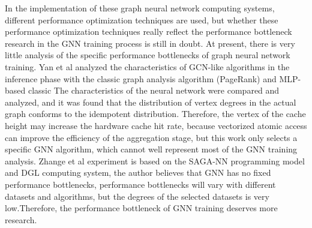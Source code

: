 In the implementation of these graph neural network computing systems, 
different performance optimization techniques are used, 
but whether these performance optimization techniques really reflect the performance bottleneck
research in the GNN training process is still in doubt. 
At present, there is very little analysis of the specific performance bottlenecks of graph 
neural network training. Yan et al\cite{yan2020_analysis_gcns_gpu} analyzed the characteristics of GCN-like algorithms
in the inference phase with the classic graph analysis algorithm (PageRank) and MLP-based classic
The characteristics of the neural network were compared and analyzed, 
and it was found that the distribution of vertex degrees in the actual graph conforms
 to the idempotent distribution. Therefore, the vertex of the cache height may increase the hardware
cache hit rate, because vectorized atomic access can improve the efficiency of the aggregation stage, 
but this work only selects a specific GNN algorithm, which cannot well represent most of the GNN training
analysis. Zhange et al\cite{zhang2020_analysis_neugraph} experiment is based on the SAGA-NN programming model and DGL computing system,
the author believes that GNN has no fixed performance bottlenecks, performance bottlenecks will vary with different datasets and algorithms, 
but the degrees of the selected datasets is very low.Therefore, the performance bottleneck of GNN training deserves more research.


